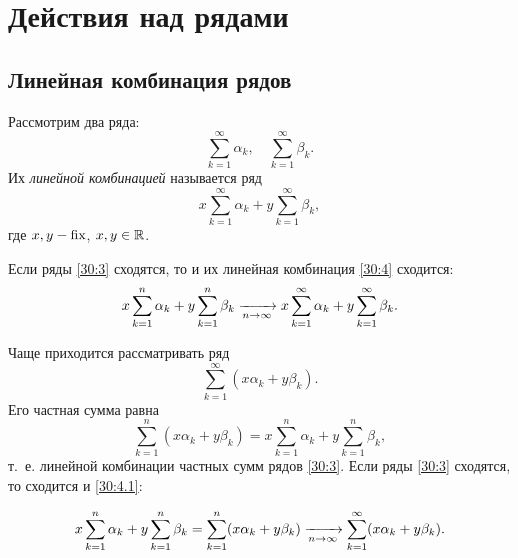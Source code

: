 \documentclass[../../main.tex]{subfiles}
\begin{document}
\section{Действия над рядами}
\subsection{Линейная комбинация рядов}
Рассмотрим два ряда:
\begin{equation}
\label{30:3}
\sum\limits_{k = 1}^{\infty} \alpha_k,\quad
\sum\limits_{k = 1}^{\infty} \beta_k. 
\end{equation}
Их \emph{линейной комбинацией} называется ряд
\begin{equation}
\label{30:4}
x \sum\limits_{k = 1}^{\infty} \alpha_k +
y \sum\limits_{k = 1}^{\infty} \beta_k, 
\end{equation}
где $x,y - \operatorname{fix}$, $x, y \in\mathbb{R}$.

Если ряды \eqref{30:3}
сходятся, то и их линейная комбинация \eqref{30:4} сходится:
\[x \sum\limits_{k = 1}^{n} \alpha_k + y \sum\limits_{k = 1}^{n} \beta_k
\xrightarrow[n \to \infty]{}
x \sum\limits_{k = 1}^{\infty} \alpha_k +
y \sum\limits_{k = 1}^{\infty} \beta_k.\]

Чаще приходится рассматривать ряд 
\begin{equation}
\label{30:4.1}
\sum\limits_{k = 1}^{\infty} (x \alpha_k + y \beta_k). 
\end{equation}
Его частная сумма равна
\[\sum\limits_{k = 1}^{n} (x \alpha_k + y \beta_k) = x \sum\limits_{k = 1}^{n} 
\alpha_k + y \sum\limits_{k = 1}^{n} \beta_k,\] т.~е. линейной комбинации 
частных сумм рядов \eqref{30:3}. Если ряды \eqref{30:3} сходятся, то сходится 
и \eqref{30:4.1}:

\[x \sum\limits_{k = 1}^{n} \alpha_k + y \sum\limits_{k = 1}^{n} \beta_k
= \sum\limits_{k = 1}^{n} (x \alpha_k + y \beta_k)
\xrightarrow[n \to \infty]{}
\sum\limits_{k = 1}^{\infty} (x \alpha_k + y \beta_k).\]
\end{document}
